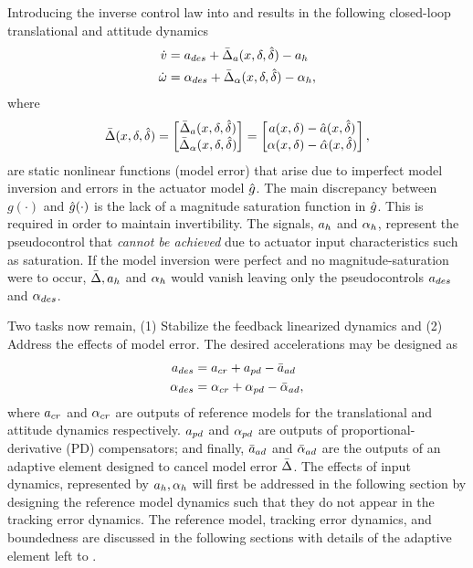 %
Introducing the inverse control law  into
 and  results in the following closed-loop
translational and attitude dynamics
%
\begin{align}\label{e:integrator}
\dot{v} &= a_{des}  + \bar{\Delta}_{a}(x,\delta,\hat{\delta}) -a_{h} \nonumber \\
 \dot{\omega} &= \alpha_{des} + \bar{\Delta}_{\alpha}(x,\delta,\hat{\delta}) - \alpha_{h},
\end{align}
%
%
where%
\begin{equation}\label{e:Delbar}
\bar{\Delta}(x,\delta,\hat{\delta}) =
\begin{bmatrix}
\bar{\Delta}_{a}(x,\delta,\hat{\delta}) \\
\bar{\Delta}_{\alpha}(x,\delta,\hat{\delta})
\end{bmatrix}
=
\begin{bmatrix}
a(x,\delta) - \hat{a}(x,\hat{\delta}) \\
\alpha(x,\delta) - \hat{\alpha}(x,\hat{\delta})
\end{bmatrix},
\end{equation}
are static nonlinear functions (model error) that arise due to
imperfect model inversion and errors in the actuator model $\hat{g}$. The main discrepancy between $g(\cdot)$ and $\hat{g}(\cdot)$ is the lack of a magnitude saturation function in $\hat{g}$. This is required in order to maintain invertibility.
The signals, $a_{h}$ and $\alpha_{h}$, represent the pseudocontrol that
\emph{cannot be achieved} due to actuator input characteristics such as
saturation. If the model inversion were perfect and no magnitude-saturation
were to occur, $\bar{\Delta},a_{h}$ and $\alpha_{h}$ would vanish leaving only
the pseudocontrols $a_{des}$ and $\alpha_{des}$.

Two tasks now remain, (1) Stabilize the feedback linearized dynamics and (2) Address the effects of model error.
The desired accelerations may be designed as
%
\begin{equation}
\begin{split}\label{e:nu}
a_{des}  &= a_{cr}  + a_{pd}  - \bar{a}_{ad} \\
\alpha_{des} &= \alpha_{cr} + \alpha_{pd} - \bar{\alpha}_{ad},
\end{split}
\end{equation}
%
where $a_{cr}$ and $\alpha_{cr}$ are outputs of reference models for the
translational and attitude dynamics respectively. $a_{pd}$ and $\alpha_{pd}$
are outputs of proportional-derivative (PD) compensators; and
finally, $\bar{a}_{ad}$ and $\bar{\alpha}_{ad}$ are the outputs of an adaptive element designed to cancel model error $\bar{\Delta}$. The effects of
input dynamics, represented by $a_{h},\alpha_{h}$ will first be addressed in
the following section by designing the reference model dynamics such
that they do not appear in the tracking error dynamics. The
reference model, tracking error dynamics, and boundedness are
discussed in the following sections with details of the adaptive element left to .
%
